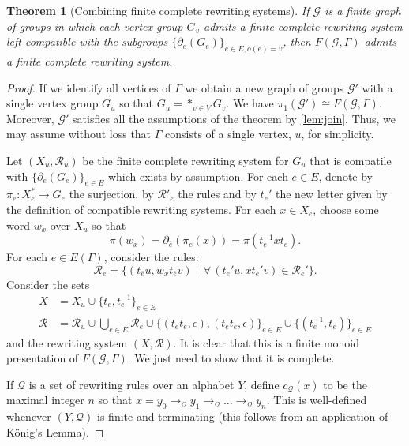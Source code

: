 \documentclass[12pt, a4paper]{amsart}
\newtheorem{theorem}{Theorem}[section]
\theoremstyle{definition}
\begin{document}
\begin{theorem}[Combining finite complete rewriting systems]
\label{thm:combination}
If $\mathcal{G}$ is a finite graph of groups in which each vertex group $G_v$ admits a finite complete rewriting system left compatible with the subgroups $\{\partial_e(G_e)\}_{e\in E, o(e) = v}$, then $F(\mathcal{G}, \Gamma)$ admits a finite complete rewriting system.
\end{theorem}

\begin{proof}
If we identify all vertices of $\Gamma$ we obtain a new graph of groups $\mathcal{G}'$ with a single vertex group $G_u$ so that $G_u = *_{v\in V}G_v$. We have $\pi_1(\mathcal{G}') \cong F(\mathcal{G}, \Gamma)$. Moreover, $\mathcal{G}'$ satisfies all the assumptions of the theorem by \cref{lem:join}. Thus, we may assume without loss that $\Gamma$ consists of a single vertex, $u$, for simplicity.

Let $(X_u, \mathcal{R}_u)$ be the finite complete rewriting system for $G_u$ that is compatile with $\{\partial_e(G_e)\}_{e\in E}$ which exists by assumption. For each $e\in E$, denote by $\pi_e\colon X_{e}^*\to G_e$ the surjection, by $\mathcal{R}'_e$ the rules and by $t_e'$ the new letter given by the definition of compatible rewriting systems. For each $x\in X_e$, choose some word $w_x$ over $X_{u}$ so that 
\[
\pi(w_x) = \partial_{\overline{e}}(\pi_e(x)) = \pi(t_{e}^{-1}xt_e).
\]
For each $e\in E(\Gamma)$, consider the rules:
\[
\mathcal{R}_e = \{(t_{\overline{e}}u, w_xt_{\overline{e}}v) \mid \,\forall\, (t_{e}'u, xt_{e}'v)\in \mathcal{R}_e'\}.
\]
Consider the sets
\begin{align*}
X &= X_u \cup \{t_e, t_e^{-1}\}_{e\in E}\\
\mathcal{R} &= \mathcal{R}_u\cup \bigcup_{e\in E}\mathcal{R}_e\cup \{(t_et_{\overline{e}}, \epsilon), (t_{\overline{e}}t_e, \epsilon)\}_{e\in E}\cup \{(t_{e}^{-1}, t_{\overline{e}})\}_{e\in E}
\end{align*}
and the rewriting system $(X, \mathcal{R})$. It is clear that this is a finite monoid presentation of $F(\mathcal{G}, \Gamma)$. We just need to show that it is complete.

If $\mathcal{Q}$ is a set of rewriting rules over an alphabet $Y$, define $c_{\mathcal{Q}}(x)$ to be the maximal integer $n$ so that $x = y_0\to_{\mathcal{Q}}y_1\to_{\mathcal{Q}}\ldots\to_{\mathcal{Q}}y_n$. This is well-defined whenever $(Y, \mathcal{Q})$ is finite and terminating (this follows from an application of K\"onig's Lemma). 


\end{proof}
\end{document}
